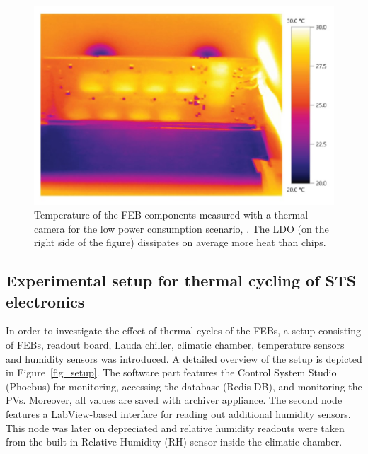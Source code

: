\begin{figure}[!h]
\centering
\includegraphics[width=0.6\columnwidth]{Chapter4/images/feb_thermal.jpg}
\caption{Temperature of the \gls{FEB} components measured with a thermal camera for the low power consumption scenario, \cite{leo_electronics}. The \gls{LDO} (on the right side of the figure) dissipates on average more heat than chips.}
\label{fig_temperatures_camera}
\end{figure}




\subsection{Experimental setup for thermal cycling of STS electronics}
\label{cycling_setup}
In order to investigate the effect of thermal cycles of the FEBs, a setup consisting of FEBs, readout board, Lauda chiller, climatic chamber, temperature sensors and humidity sensors was introduced.
A detailed overview of the setup is depicted in Figure~\ref{fig_setup}. The software part features the Control System Studio (Phoebus) for monitoring, accessing the database (Redis DB), and monitoring the \gls{PV}s. Moreover, all values are saved with archiver appliance. The second node features a LabView-based interface for reading out additional humidity sensors. This node was later on depreciated and relative humidity readouts were taken from the built-in Relative Humidity (\gls{RH}) sensor inside the climatic chamber.

